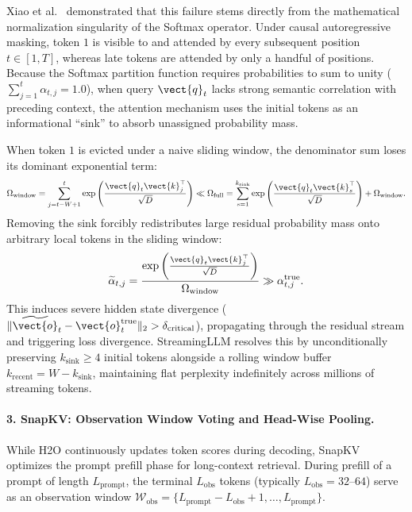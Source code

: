 Xiao et al.~\cite{xiao2024streamingllm} demonstrated that this failure stems directly from the mathematical normalization singularity of the Softmax operator. Under causal autoregressive masking, token $1$ is visible to and attended by every subsequent position $t \in [1, T]$, whereas late tokens are attended by only a handful of positions. Because the Softmax partition function requires probabilities to sum to unity ($\sum_{j=1}^t \alpha_{t, j} = 1.0$), when query $\vect{q}_t$ lacks strong semantic correlation with preceding context, the attention mechanism uses the initial tokens as an informational ``sink'' to absorb unassigned probability mass.

When token $1$ is evicted under a naive sliding window, the denominator sum loses its dominant exponential term:
\begin{equation}
\label{eq:streamingllm_singularity}
\Omega_{\text{window}} = \sum_{j=t-W+1}^t \exp\left( \frac{\vect{q}_t \vect{k}_j^\top}{\sqrt{D}} \right) \ll \Omega_{\text{full}} = \sum_{s=1}^{k_{\text{sink}}} \exp\left( \frac{\vect{q}_t \vect{k}_s^\top}{\sqrt{D}} \right) + \Omega_{\text{window}}.
\end{equation}
Removing the sink forcibly redistributes large residual probability mass onto arbitrary local tokens in the sliding window:
\begin{equation}
\label{eq:streamingllm_distortion}
\widetilde{\alpha}_{t, j} = \frac{\exp\left( \frac{\vect{q}_t \vect{k}_j^\top}{\sqrt{D}} \right)}{\Omega_{\text{window}}} \gg \alpha_{t, j}^{\text{true}}.
\end{equation}
This induces severe hidden state divergence ($\|\widetilde{\vect{o}}_t - \vect{o}_t^{\text{true}}\|_2 > \delta_{\text{critical}}$), propagating through the residual stream and triggering loss divergence. StreamingLLM resolves this by unconditionally preserving $k_{\text{sink}} \ge 4$ initial tokens alongside a rolling window buffer $k_{\text{recent}} = W - k_{\text{sink}}$, maintaining flat perplexity indefinitely across millions of streaming tokens.

\paragraph{3. SnapKV: Observation Window Voting and Head-Wise Pooling.}
While \textsc{H2O} continuously updates token scores during decoding, SnapKV~\cite{li2024snapkv} optimizes the prompt prefill phase for long-context retrieval. During prefill of a prompt of length $L_{\text{prompt}}$, the terminal $L_{\text{obs}}$ tokens (typically $L_{\text{obs}} = 32\text{--}64$) serve as an observation window $\mathcal{W}_{\text{obs}} = \{L_{\text{prompt}} - L_{\text{obs}} + 1, \dots, L_{\text{prompt}}\}$.

